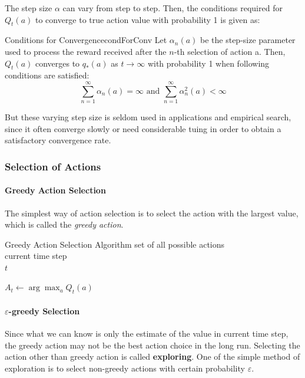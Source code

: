 \documentclass[../../main.tex]{subfiles}
\begin{document}
            The step size $\alpha$ can vary from step to step. 
            Then, the conditions required for $Q_t(a)$ to converge to true action value with probability 1 is given as:
            \begin{thm}{Conditions for Convergence}{condForConv}
                Let $\alpha_n(a)$ be the step-size parameter used to process the reward received after the $n$-th selection of action a.
                Then, $Q_t(a)$ converges to $q_*(a)$ as $t \to \infty$ with probability 1 when following conditions are satisfied:
                \[
                \sum_{n=1}^{\infty}\alpha_n(a)=\infty \text{ and } \sum_{n=1}^{\infty}\alpha_n^2(a) < \infty
                \]
            \end{thm}
            But these varying step size is seldom used in applications and empirical search, since it often converge slowly or need considerable tuing in order to obtain a satisfactory convergence rate.
        
        \subsubsection{Selection of Actions}
            \paragraph{Greedy Action Selection}
            The simplest way of action selection is to select the action with the largest value, which is called the \emph{greedy action}.
            
            {
                Greedy Action Selection Algorithm
            }
            {
                 {set of all possible actions} \\
                 {current time step }\\
            }
            {
                 $t$
            }
            {
                $A_t \leftarrow \arg\max_a{Q_t(a)}$\;
            
            }

            \paragraph{$\varepsilon$-greedy Selection}
            Since what we can know is only the estimate of the value in current time step, the greedy action may not be the best action choice in the long run.
            Selecting the action other than greedy action is called \textbf{exploring}. One of the simple method of exploration is to select non-greedy actions
            with certain probability $\varepsilon$.
\end{document}
